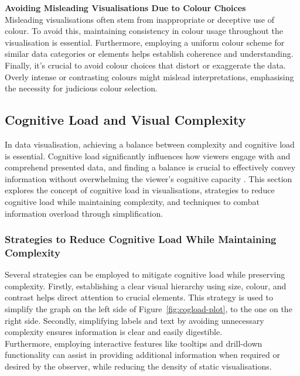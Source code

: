 \documentclass{article}\usepackage[]{graphicx}\usepackage[]{xcolor}
\numberwithin{equation}{section}
\begin{document}
\noindent \textbf{Avoiding Misleading Visualisations Due to Colour Choices}\\
Misleading visualisations often stem from inappropriate or deceptive use of colour. To avoid this, maintaining consistency in colour usage throughout the visualisation is essential. Furthermore, employing a uniform colour scheme for similar data categories or elements helps establish coherence and understanding. Finally, it's crucial to avoid colour choices that distort or exaggerate the data. Overly intense or contrasting colours might mislead interpretations, emphasising the necessity for judicious colour selection.

\subsection{Cognitive Load and Visual Complexity}
In data visualisation, achieving a balance between complexity and cognitive load is essential. Cognitive load significantly influences how viewers engage with and comprehend presented data, and finding a balance is crucial to effectively convey information without overwhelming the viewer's cognitive capacity \cite{tufte2001visual}. This section explores the concept of cognitive load in visualisations, strategies to reduce cognitive load while maintaining complexity, and techniques to combat information overload through simplification.

\subsubsection{Strategies to Reduce Cognitive Load While Maintaining Complexity}
Several strategies can be employed to mitigate cognitive load while preserving complexity. Firstly, establishing a clear visual hierarchy using size, colour, and contrast helps direct attention to crucial elements. This strategy is used to simplify the graph on the left side of Figure~\ref{fig:cogload-plot}, to the one on the right side. Secondly, simplifying labels and text by avoiding unnecessary complexity ensures information is clear and easily digestible.\\

\noindent Furthermore, employing interactive features like tooltips and drill-down functionality can assist in providing additional information when required or desired by the observer, while reducing the density of static visualisations.\\
\end{document}

